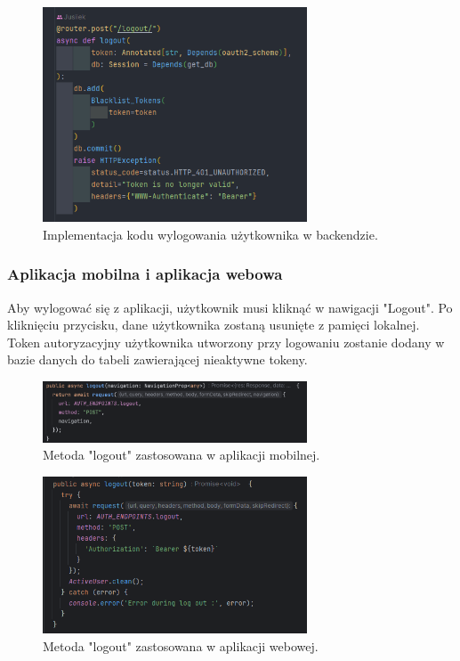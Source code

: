 \begin{figure}[H]
    \centering
    \includegraphics[width=0.7\textwidth]{chapters/chapter_8/screens/wylogowanie_backend}
    \caption{Implementacja kodu wylogowania użytkownika w backendzie.}
    \label{img:wylogowanie_backend}
\end{figure}

\subsubsection{Aplikacja mobilna i aplikacja webowa}
Aby wylogować się z aplikacji, użytkownik musi kliknąć w nawigacji "Logout". Po kliknięciu przycisku, dane użytkownika zostaną usunięte z pamięci lokalnej. Token autoryzacyjny użytkownika utworzony przy logowaniu zostanie dodany w bazie danych do tabeli zawierającej nieaktywne tokeny.

\begin{figure}[H]
    \centering
    \includegraphics[width=0.7\textwidth]{chapters/chapter_8/screens/wylogowanie_mobile}
    \caption{Metoda "logout" zastosowana w aplikacji mobilnej.}
    \label{img:wylogowanie_mobile}
\end{figure}

\begin{figure}[H]
    \centering
    \includegraphics[width=0.7\textwidth]{chapters/chapter_8/screens/wylogowanie_web}
    \caption{Metoda "logout" zastosowana w aplikacji webowej.}
    \label{img:wylogowanie_web}
\end{figure}

